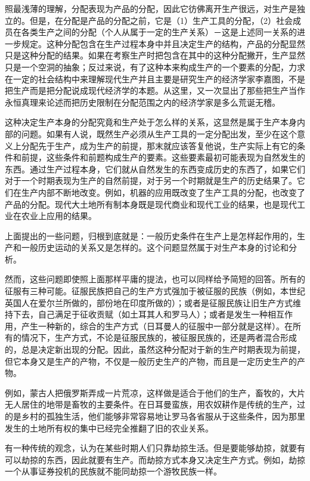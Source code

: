 \documentclass[a4paper,twoside,12pt]{ctexart}
\begin{document}
照最浅薄的理解，分配表现为产品的分配，因此它彷佛离开生产很远，对生产是独立的。但是，在分配是产品的分配之前，它是（1）生产工具的分配，（2）社会成员在各类生产之间的分配（个人从属于一定的生产关系）－这是上述同一关系的进一步规定。这种分配包含在生产过程本身中并且决定生产的结构，产品的分配显然只是这种分配的结果。如果在考察生产时把包含在其中的这种分配撇开，生产显然只是一个空洞的抽象；反过来说，有了这种本来构成生产的一个要素的分配，力求在一定的社会结构中来理解现代生产并且主要是研究生产的经济学家李嘉图，不是把生产而是把分配说成现代经济学的本题。从这里，又一次显出了那些把生产当作永恒真理来论述而把历史限制在分配范围之内的经济学家是多么荒诞无稽。

这种决定生产本身的分配究竟和生产处于怎么样的关系，这显然是属于生产本身内部的问题。如果有人说，既然生产必须从生产工具的一定分配出发，至少在这个意义上分配先于生产，成为生产的前提，那末就应该答复他说，生产实际上有它的条件和前提，这些条件和前题构成生产的要素。这些要素最初可能表现为自然发生的东西。通过生产过程本身，它们就从自然发生的东西变成历史的东西了，如果它们对于一个时期表现为生产的自然前提，对于另一个时期就是生产的历史结果了。它们在生产内部不断地改变。例如，机器的应用既改变了生产工具的分配，也改变了产品的分配。现代大土地所有制本身既是现代商业和现代工业的结果，也是现代工业在农业上应用的结果。

上面提出的一些问题，归根到底就是：一般历史条件在生产上是怎样起作用的，生产和一般历史运动的关系又是怎样的。这个问题显然属于对生产本身的讨论和分析。

然而，这些问题即使照上面那样平庸的提法，也可以同样给予简短的回答。所有的征服有三种可能。征服民族把自己的生产方式强加于被征服的民族（例如，本世纪英国人在爱尔兰所做的，部份地在印度所做的）；或者是征服民族让旧生产方式维持下去，自己满足于征收贡赋（如土耳其人和罗马人）；或者是发生一种相互作用，产生一种新的，综合的生产方式（日耳曼人的征服中一部分就是这样）。在所有的情况下，生产方式，不论是征服民族的，被征服民族的，还是两者混合形成的，总是决定新出现的分配。因此，虽然这种分配对于新的生产时期表现为前提，但它本身又是生产的产物，不仅是一般历史生产的产物，而且是一定历史生产的产物。

例如，蒙古人把俄罗斯弄成一片荒凉，这样做是适合于他们的生产，畜牧的，大片无人居住的地带是畜牧的主要条件。在日耳曼蛮族，用农奴耕作是传统的生产，过的是乡村的孤独生活，他们能够非常容易地让罗马各省服从于这些条件，因为那里发生的土地所有权的集中已经完全推翻了旧的农业关系。

有一种传统的观念，认为在某些时期人们只靠劫掠生活。但是要能够劫掠，就要有可以劫掠的东西，因此就要有生产。而劫掠方式本身又决定生产方式。例如，劫掠一个从事证券投机的民族就不能同劫掠一个游牧民族一样。
\end{document}
